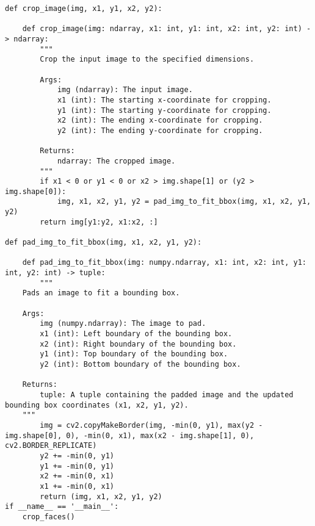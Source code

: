 \begin{verbatim}
def crop_image(img, x1, y1, x2, y2):

    def crop_image(img: ndarray, x1: int, y1: int, x2: int, y2: int) -> ndarray:
        """
        Crop the input image to the specified dimensions.

        Args:
            img (ndarray): The input image.
            x1 (int): The starting x-coordinate for cropping.
            y1 (int): The starting y-coordinate for cropping.
            x2 (int): The ending x-coordinate for cropping.
            y2 (int): The ending y-coordinate for cropping.

        Returns:
            ndarray: The cropped image.
        """
        if x1 < 0 or y1 < 0 or x2 > img.shape[1] or (y2 > img.shape[0]):
            img, x1, x2, y1, y2 = pad_img_to_fit_bbox(img, x1, x2, y1, y2)
        return img[y1:y2, x1:x2, :]

def pad_img_to_fit_bbox(img, x1, x2, y1, y2):

    def pad_img_to_fit_bbox(img: numpy.ndarray, x1: int, x2: int, y1: int, y2: int) -> tuple:
        """
    Pads an image to fit a bounding box.

    Args:
        img (numpy.ndarray): The image to pad.
        x1 (int): Left boundary of the bounding box.
        x2 (int): Right boundary of the bounding box.
        y1 (int): Top boundary of the bounding box.
        y2 (int): Bottom boundary of the bounding box.

    Returns:
        tuple: A tuple containing the padded image and the updated bounding box coordinates (x1, x2, y1, y2).
    """
        img = cv2.copyMakeBorder(img, -min(0, y1), max(y2 - img.shape[0], 0), -min(0, x1), max(x2 - img.shape[1], 0), cv2.BORDER_REPLICATE)
        y2 += -min(0, y1)
        y1 += -min(0, y1)
        x2 += -min(0, x1)
        x1 += -min(0, x1)
        return (img, x1, x2, y1, y2)
if __name__ == '__main__':
    crop_faces()
\end{verbatim}